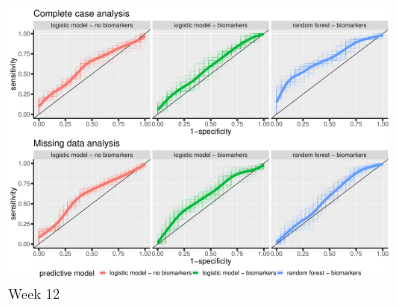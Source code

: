 \documentclass[12pt]{article}
\begin{document}
\begin{figure}[!h]
\centering
\includegraphics[trim={0 0 0 0},width=0.9\textwidth]{./figures/ROC-pred-week12.pdf}
\caption{\label{fig:perfW12-ROC}Week 12}
\end{figure}
\end{document}
